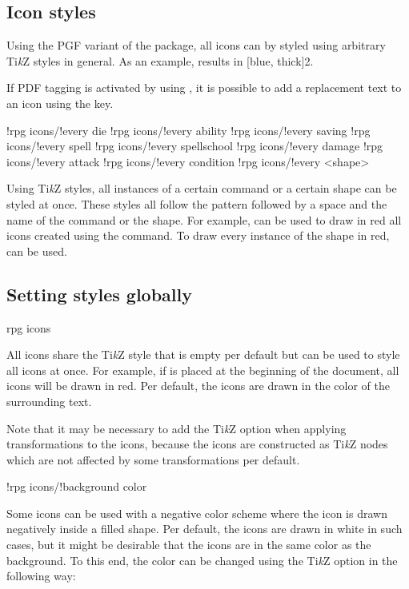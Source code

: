 \documentclass[a4paper]{article}
\begin{document}
\subsection{Icon styles}

Using the PGF variant of the package, all icons can by styled using arbitrary Ti\emph{k}Z styles in general. As an example,  results in [blue, thick]{2}.

If PDF tagging is activated by using , it is possible to add a replacement text to an icon using the  key.

\begin{macrodef}
!rpg icons/!every die
!rpg icons/!every ability
!rpg icons/!every saving
!rpg icons/!every spell
!rpg icons/!every spellschool
!rpg icons/!every damage
!rpg icons/!every attack
!rpg icons/!every condition
!rpg icons/!every <shape>
\end{macrodef}
Using Ti\emph{k}Z styles, all instances of a certain command or a certain shape can be styled at once. These styles all follow the pattern  followed by a space and the name of the command or the shape. For example,  can be used to draw in red all icons created using the \macro{\die} command. To draw every instance of the  shape in red,  can be used.

\subsection{Setting styles globally}

\begin{macrodef}rpg icons\end{macrodef}
All icons share the Ti\emph{k}Z style  that is empty per default but can be used to style all icons at once. For example, if  is placed at the beginning of the document, all icons will be drawn in red. Per default, the icons are drawn in the color of the surrounding text.

Note that it may be necessary to add the Ti\emph{k}Z option  when applying transformations to the icons, because the icons are constructed as Ti\emph{k}Z nodes which are not affected by some transformations per default.

\begin{macrodef}!rpg icons/!background color\end{macrodef}
Some icons can be used with a negative color scheme where the icon is drawn negatively inside a filled shape. Per default, the icons are drawn in white in such cases, but it might be desirable that the icons are in the same color as the background. To this end, the color can be changed using the Ti\emph{k}Z option  in the following way:
\end{document}
